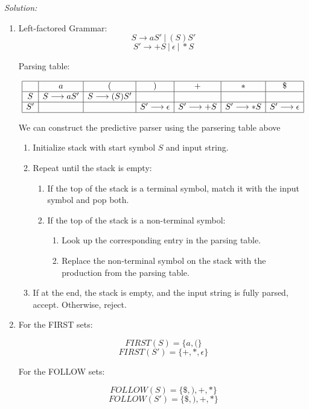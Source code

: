 \documentclass[a4paper, 11pt]{article}
\newenvironment{solution}
    {\textit{Solution:}}
    {}
\begin{document}
\begin{solution}
\begin{enumerate}[a]
    \item 
Left-factored Grammar:
\[ S \longrightarrow aS' \ | \ (S)S' \]
\[ S' \longrightarrow +S \ | \ \epsilon \ | \ *S \]

Parsing table:

\[
\begin{array}{|c|c|c|c|c|c|c|}
\hline
& a & ( & ) & + & * & \$ \\
\hline
S & S \longrightarrow aS' & S \longrightarrow (S)S' & & & & \\
\hline
S' & & & S' \longrightarrow \epsilon & S' \longrightarrow +S & S' \longrightarrow *S & S' \longrightarrow \epsilon \\
\hline
\end{array}
\]

We can construct the predictive parser using the parsering table above

\begin{enumerate}
    \item Initialize stack with start symbol $S$ and input string.
    \item Repeat until the stack is empty:
    \begin{enumerate}[a]
        \item If the top of the stack is a terminal symbol, match it with the input symbol and pop both.
        \item If the top of the stack is a non-terminal symbol:
        \begin{enumerate}
            \item Look up the corresponding entry in the parsing table.
            \item Replace the non-terminal symbol on the stack with the production from the parsing table.
        \end{enumerate}
    \end{enumerate}
    \item If at the end, the stack is empty, and the input string is fully parsed, accept. Otherwise, reject.
\end{enumerate}


 
    \item For the FIRST sets:

\[ FIRST(S) = \{a, (\} \]
\[ FIRST(S') = \{+, *, \epsilon\} \]

For the FOLLOW sets:

\[ FOLLOW(S) = \{\$, ), +, *\} \]
\[ FOLLOW(S') = \{\$, ), +, *\} \]
\end{enumerate}
\end{solution} 
\end{document}
